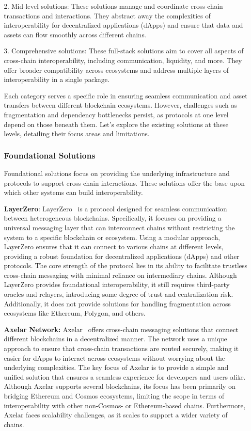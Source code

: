 2. Mid-level solutions: These solutions manage and coordinate cross-chain transactions and interactions. They abstract away the complexities of interoperability for decentralized applications (dApps) and ensure that data and assets can flow smoothly across different chains.

3. Comprehensive solutions: These full-stack solutions aim to cover all aspects of cross-chain interoperability, including communication, liquidity, and more. They offer broader compatibility across ecosystems and address multiple layers of interoperability in a single package. 

Each category serves a specific role in ensuring seamless communication and asset transfers between different blockchain ecosystems. However, challenges such as fragmentation and dependency bottlenecks persist, as protocols at one level depend on those beneath them. Let’s explore the existing solutions at these levels, detailing their focus areas and limitations.

\subsubsection{Foundational Solutions}

Foundational solutions focus on providing the underlying infrastructure and protocols to support cross-chain interactions. These solutions offer the base upon which other systems can build interoperability.

\textbf{LayerZero}: LayerZero~\cite{layerzero} is a protocol designed for seamless communication between heterogeneous blockchains. Specifically, it focuses on providing a universal messaging layer that can interconnect chains without restricting the system to a specific blockchain or ecosystem. Using a modular approach, LayerZero ensures that it can connect to various chains at different levels, providing a robust foundation for decentralized applications (dApps) and other protocols. The core strength of the protocol lies in its ability to facilitate trustless cross-chain messaging with minimal reliance on intermediary chains. Although LayerZero provides foundational interoperability, it still requires third-party oracles and relayers, introducing some degree of trust and centralization risk. Additionally, it does not provide solutions for handling fragmentation across ecosystems like Ethereum, Polygon, and others.

\textbf{Axelar Network:} Axelar~\cite{axelar} offers cross-chain messaging solutions that connect different blockchains in a decentralized manner. The network uses a unique approach to ensure that cross-chain transactions are routed securely, making it easier for dApps to interact across ecosystems without worrying about the underlying complexities. The key focus of Axelar is to provide a simple and unified solution that ensures a seamless experience for developers and users alike. Although Axelar supports several blockchains, its focus has been primarily on bridging Ethereum and Cosmos ecosystems, limiting the scope in terms of interoperability with other non-Cosmos- or Ethereum-based chains. Furthermore, Axelar faces scalability challenges, as it scales to support a wider variety of chains.

